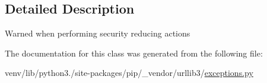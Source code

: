 \subsection{Detailed Description}
\begin{DoxyVerb}Warned when performing security reducing actions\end{DoxyVerb}
 

The documentation for this class was generated from the following file\+:\begin{DoxyCompactItemize}
\item 
venv/lib/python3./site-\/packages/pip/\+\_\+vendor/urllib3/\hyperlink{pip_2__vendor_2urllib3_2exceptions_8py}{exceptions.\+py}\end{DoxyCompactItemize}
